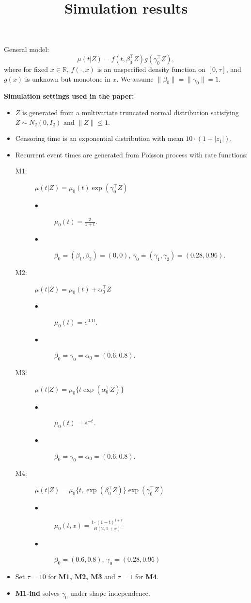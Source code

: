 \documentclass[a4paper,10pt]{article}
\title{Simulation results}
\author{}
\date{}
\begin{document}
\maketitle
\thispagestyle{empty} 
\pagestyle{empty}

\noindent
General model:
\begin{equation*}
\mu(t|Z) = f(t, \beta_0^\top Z)g(\gamma_0^\top Z),
\end{equation*}
where for fixed $x\in\mathbb{R}$,
$f(\cdot, x)$ is an unspecified density function on $[0, \tau]$, 
and $g(x)$ is unknown but monotone in $x$.
We assume $\|\beta_0\|=\|\gamma_0\|=1$.\newline

\textbf{Simulation settings used in the paper:} 
\begin{itemize}
\item $Z$ is generated from a multivariate truncated normal distribution 
satisfying $Z\sim N_2(0, I_2)$ and $\|Z\|\le1$.
\item Censoring time is an exponential distribution with mean $10\cdot(1 + |z_1|)$.
\item Recurrent event times are generated from Poisson process with rate functions:
\begin{description}
\item[M1:] $\mu(t|Z) = \mu_0(t) \exp(\gamma_0^\top Z)$
\begin{description}
\item[$\bullet$] $\mu_0(t) = \frac{2}{1 + t}$.
\item[$\bullet$] $\beta_0 = (\beta_1, \beta_2) = (0, 0)$, $\gamma_0 = (\gamma_1, \gamma_2) = (0.28, 0.96)$.
\end{description}
\item[M2:] $\mu(t|Z) = \mu_0(t) + \alpha_0^\top Z$
\begin{description}
\item[$\bullet$] $\mu_0(t) = e^{0.1t}$.
\item[$\bullet$] $\beta_0 = \gamma_0 = \alpha_0 = (0.6, 0.8)$.
\end{description}
\item[M3:] $\mu(t|Z) = \mu_0\{t\exp(\alpha_0^\top Z)\}$
\begin{description}
\item[$\bullet$] $\mu_0(t) = e^{-t}$.
\item[$\bullet$] $\beta_0 = \gamma_0 = \alpha_0 = (0.6, 0.8)$.
\end{description}
\item[M4:] $\mu(t|Z) = \mu_0\{t, \exp(\beta_0^\top Z)\}\exp(\gamma_0^\top Z)$
\begin{description}
\item[$\bullet$] $\mu_0(t, x) = \frac{t\cdot(1 - t)^{1+x}}{B(2, 1+x)}$
\item[$\bullet$] $\beta_0 = (0.6, 0.8)$, $\gamma_0 = (0.28, 0.96)$
\end{description}
\end{description}
\item Set $\tau = 10$ for \textbf{M1, M2, M3} and $\tau = 1$ for \textbf{M4}.
\item \textbf{M1-ind} solves $\gamma_0$ under shape-independence.
\end{itemize}
\end{document}
